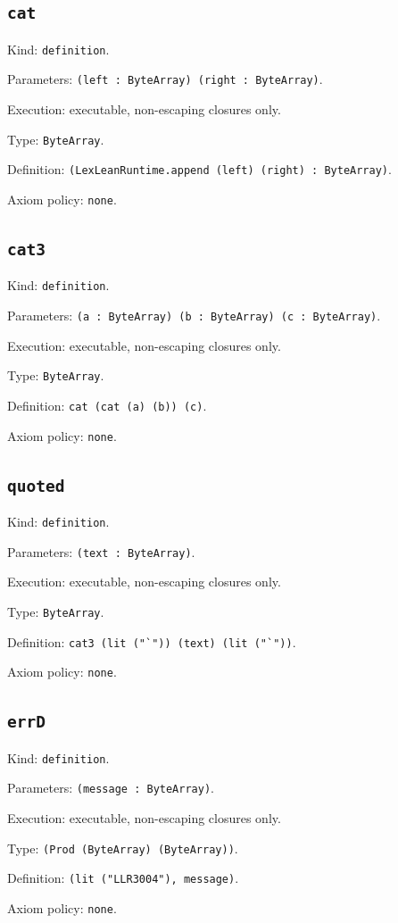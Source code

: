 \documentclass[11pt]{article}
\begin{document}
\subsection*{\texttt{cat}}
\noindent Kind: \texttt{definition}.\par
\noindent Parameters: \texttt{(left : ByteArray) (right : ByteArray)}.\par
\noindent Execution: executable, non-escaping closures only.\par
\noindent Type: \texttt{ByteArray}.\par
\noindent Definition: \texttt{(LexLeanRuntime.append (left) (right) : ByteArray)}.\par
\noindent Axiom policy: \texttt{none}.\par
\subsection*{\texttt{cat3}}
\noindent Kind: \texttt{definition}.\par
\noindent Parameters: \texttt{(a : ByteArray) (b : ByteArray) (c : ByteArray)}.\par
\noindent Execution: executable, non-escaping closures only.\par
\noindent Type: \texttt{ByteArray}.\par
\noindent Definition: \texttt{cat (cat (a) (b)) (c)}.\par
\noindent Axiom policy: \texttt{none}.\par
\subsection*{\texttt{quoted}}
\noindent Kind: \texttt{definition}.\par
\noindent Parameters: \texttt{(text : ByteArray)}.\par
\noindent Execution: executable, non-escaping closures only.\par
\noindent Type: \texttt{ByteArray}.\par
\noindent Definition: \texttt{cat3 (lit ("`")) (text) (lit ("`"))}.\par
\noindent Axiom policy: \texttt{none}.\par
\subsection*{\texttt{errD}}
\noindent Kind: \texttt{definition}.\par
\noindent Parameters: \texttt{(message : ByteArray)}.\par
\noindent Execution: executable, non-escaping closures only.\par
\noindent Type: \texttt{(Prod (ByteArray) (ByteArray))}.\par
\noindent Definition: \texttt{(lit ("LLR3004"), message)}.\par
\noindent Axiom policy: \texttt{none}.\par
\end{document}
